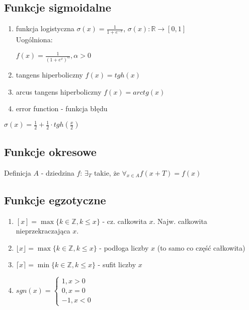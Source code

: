 \documentclass{article}
\theoremstyle{definition}
\theoremstyle{definition}
\theoremstyle{definition}
\theoremstyle{definition}
\begin{document}
\subsection{Funkcje sigmoidalne}

\begin{enumerate}
    \item funkcja logistyczna $\sigma(x)=\frac{1}{1+e^{-x}}$, $\sigma(x): \mathbb{R}\rightarrow[0,1]$\\
    Uogólniona:

    \begin{center}
        $f(x)=\frac{1}{(1+e^x)^\alpha}, \alpha>0$
    \end{center}    
    \item tangens hiperboliczny $f(x)=tgh(x)$
    \item arcus tangens hiperboliczny $f(x)=arctg(x)$
    \item error function - funkcja błędu
\end{enumerate}

$\sigma(x)=\frac{1}{2} + \frac{1}{2}\cdot tgh(\frac{x}{2})$

\subsection{Funkcje okresowe}

Definicja $A$ - dziedzina $f$: $\exists_T$ takie, że $\forall_{x\in A} f(x+T)=f(x)$\\

\subsection{Funkcje egzotyczne}

\begin{enumerate}
\item $[x]= \max \{k\in\mathbb{Z}, k\leq x\}$ - cz. całkowita $x$. Najw. całkowita nieprzekraczająca $x$.

\item $\lfloor x \rfloor = \max \{k\in\mathbb{Z}, k\leq x\}$ - podłoga liczby $x$ (to samo co część całkowita)

\item $\lceil x \rceil = \min \{k\in\mathbb{Z}, k\leq x\}$ - sufit liczby $x$

\item $sgn(x)=\begin{cases}
    1, x>0\\
    0, x=0\\
    -1, x<0
\end{cases}
$
\end{enumerate}
\end{document}
